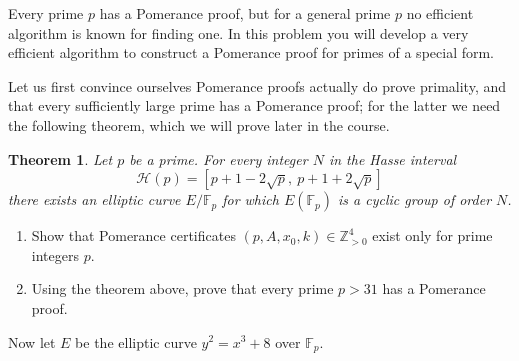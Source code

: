 \documentclass[11pt]{article}
\newcommand{\Fp}{\mathbb{F}_p}
\newcommand{\Z}{\mathbb{Z}}
\newtheorem{theorem}{Theorem}
\theoremstyle{definition}
\begin{document}
Every prime $p$ has a Pomerance proof, but for a general prime $p$ no efficient algorithm is known for finding one.
In this problem you will develop a very efficient algorithm to construct a Pomerance proof for primes of a special form.
\bigskip


Let us first convince ourselves Pomerance proofs actually do prove primality, and that every sufficiently large prime has a Pomerance proof;
for the latter we need the following theorem, which we will prove later in the course.

\begin{theorem}
Let $p$ be a prime.  For every integer $N$ in the Hasse interval
\[
\mathcal H(p) = [p+1-2\sqrt{p},\ p+1+2\sqrt{p}]
\]
there exists an elliptic curve $E/\Fp$ for which $E(\Fp)$ is a cyclic group of order $N$.
\end{theorem}

\begin{enumerate}[{\bf (a)}]
\item Show that Pomerance certificates $(p,A,x_0,k)\in \Z_{>0}^4$ exist only for prime integers $p$.
\item Using the theorem above, prove that every prime $p>31$ has a Pomerance proof.
\end{enumerate}

\noindent
Now let $E$ be the elliptic curve $y^2=x^3+8$ over $\Fp$.
\end{document}
